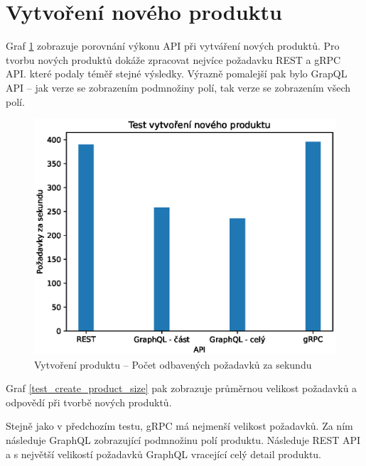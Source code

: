 \documentclass[thesis=M,czech]{FITthesis}[2019/12/23]
\begin{document}
\section{Vytvoření nového produktu}
Graf \ref{test_create_product} zobrazuje porovnání výkonu API při vytváření nových produktů. Pro tvorbu nových produktů dokáže zpracovat nejvíce požadavku REST a gRPC API. které podaly téměř stejné výsledky. Výrazně pomalejší pak bylo GrapQL API -- jak verze se zobrazením podmnožiny polí, tak verze se zobrazením všech polí.

\begin{figure}[H]
  \includegraphics[width=\linewidth]{img/create-product.eps}
  \caption{Vytvoření produktu -- Počet odbavených požadavků za sekundu}
\label{test_create_product}
\end{figure}

Graf \ref{test_create_product_size} pak zobrazuje průměrnou velikost požadavků a odpovědí při tvorbě nových produktů. 

Stejně jako v předchozím testu, gRPC má nejmenší velikost požadavků. Za ním následuje GraphQL zobrazující podmnožinu polí produktu. Následuje REST API a s největší velikostí požadavků GraphQL vracející celý detail produktu.
\end{document}
